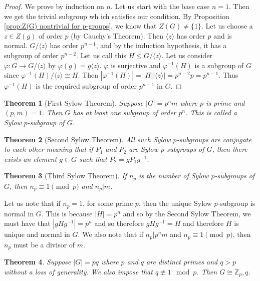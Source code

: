 \documentclass{article}
\newcommand{\Z}{\mathbb{Z}}
\newtheorem{theorem}{Theorem}[section]
\theoremstyle{definition}
\begin{document}
\begin{proof}
    We prove by induction on $n$. Let us start with the base case $n=1$. Then we get the trivial subgroup wh ich satisfies our condition. By Proposition \ref{prop:Z(G) nontrivial for p-groups}, we know that $Z(G) \neq \{1\}$. Let us choose a $z\in Z(g)$ of order $p$ (by Cauchy's Theorem). Then $\langle z \rangle$ has order $p$ and is normal. $G/\langle z \rangle$ has order $p^{n-1}$, and by the induction hypothesis, it has a subgroup of order $p^{n-2}$. Let us call this $H \leq G/\langle z \rangle$. Let us consider $\varphi : G\to G/\langle z \rangle$ by $\varphi(g) = g\langle z \rangle $. $\varphi$ is surjective and $\varphi ^{-1}(H) $ is a subgroup of $G$ since $\varphi^{-1}(H)/\langle z \rangle \cong H$. Then $|\varphi^{-1}(H)| = |H||\langle z \rangle| = p^{n-2}p = p^{n-1}$. Thus $\varphi^{-1}(H)$ is the required subgroup of order $p^{n-1}$ in $G$.
\end{proof}
\begin{theorem}[First Sylow Theorem]
    Suppose $|G| = p^nm  $ where $p$ is prime and $(p,m)=1$. Then $G$ has at least one subgroup of order $p^n$. This is called a Sylow $p$-subgroup of $G$.
\end{theorem}
\begin{theorem}[Second Sylow Theorem]
    All such Sylow $p$-subgroups are conjugate to each other meaning that if $P_1$ and $P_2$ are Sylow $p$-subgroups of $G$, then there exists an element $g \in G$ such that $P_2 = gP_1g^{-1}$.
\end{theorem}
\begin{theorem}[Third Sylow Theorem]
    If $n_p$ is the number of Sylow $p$-subgroups of $G$, then $n_p \equiv 1 \pmod{p}$ and $n_p| m$.
\end{theorem}
Let us note that if $n_p=1$, for some prime $p$, then the unique Sylow $p$-subgroup is normal in $G$. This is because $|H|=p^n$ and so by the Second Sylow Theorem, we must have that $|gHg^{-1}| = p^n$ and so therefore $gHg^{-1}= H$ and therefore $H$ is unique and normal in $G$. We also note that if $n_p |p^nm$ and $n_p \equiv 1 \pmod{p}$, then $n_p$ must be a divisor of $m$.
\begin{theorem}
    Suppose $|G|=pq$ where $p$ and $q$ are distinct primes and $q>p$ without a loss of generality. We also impose that $q\not \equiv 1 \mod p$. Then $G \cong \Z_p,q$.
\end{theorem}
\end{document}

